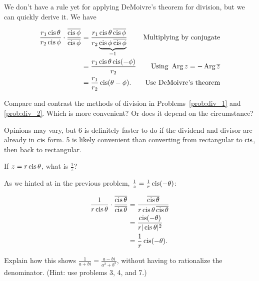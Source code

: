 \documentclass[../key.tex]{subfiles}
\begin{document}
We don't have a rule yet for applying DeMoivre's theorem for division, but we can quickly derive it. We have

\begin{align*}
\frac{r_1\operatorname{cis} \theta}{r_2\operatorname{cis} \phi} \cdot \frac{\overline{\operatorname{cis} \phi}}{\overline{\operatorname{cis} \phi}} &= \frac{r_1\operatorname{cis} \theta \, \overline{\operatorname{cis} \phi}}{r_2\underbrace{\operatorname{cis} \phi \, \overline{\operatorname{cis} \phi}}_{=1}} & \text{Multiplying by conjugate} \\
&= \frac{r_1\operatorname{cis} \theta \operatorname{cis} (-\phi)}{r_2} & \text{Using }\operatorname{Arg} z = -\operatorname{Arg} \overline{z} \\
&= \frac{r_1}{r_2}\operatorname{cis} (\theta-\phi). & \text{Use DeMoivre's theorem} \\
\end{align*}

\begin{outer_problem}
\item Compare and contrast the methods of division in Problems~\ref{prob:div_1} and \ref{prob:div_2}. Which is more convenient? Or does it depend on the circumstance?
\end{outer_problem}

Opinions may vary, but 6 is definitely faster to do if the dividend and divisor are already in $\operatorname{cis}$ form. 5 is likely convenient than converting from rectangular to $\operatorname{cis}$, then back to rectangular.

\begin{outer_problem}
\item
\end{outer_problem}

\begin{inner_problem}[start=1]
\item If $z = r\operatorname{cis} \theta$, what is $\frac{1}{z}$?
\end{inner_problem}

As we hinted at in the previous problem, $\frac{1}{z}=\frac{1}{r}\operatorname{cis} (-\theta)$:

\begin{align*}
\frac{1}{r\operatorname{cis}\theta} \cdot \frac{\overline{\operatorname{cis}\theta}}{\overline{\operatorname{cis}\theta}} &= \frac{\overline{\operatorname{cis}\theta}}{r\operatorname{cis}\theta\,\overline{\operatorname{cis}\theta}} \\
&= \frac{\operatorname{cis}(-\theta)}{r|\operatorname{cis}\theta|^2} \\
&= \frac{1}{r} \operatorname{cis}(-\theta).
\end{align*}

\begin{inner_problem}
\item Explain how this shows $\frac{1}{a+bi}=\frac{a-bi}{a^2+b^2}$, without having to rationalize the denominator. (Hint: use problems 3, 4, and 7.)
\end{inner_problem}
\end{document}
